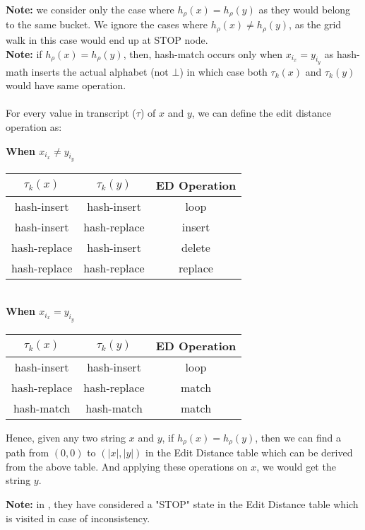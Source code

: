 \documentclass{article}
\begin{document}
\textbf{Note:} we consider only the case where $h_\rho(x)=h_\rho(y)$ as they 
would belong to the same bucket. We ignore the cases where 
$h_\rho(x)\neq h_\rho(y)$, as the grid walk in this case would end up at STOP
node.\\
\textbf{Note:} if $h_\rho(x)=h_\rho(y)$, then, hash-match occurs only when
$x_{i_x}=y_{i_y}$ as hash-math inserts the actual alphabet (not $\bot$) in which
case both $\tau_k(x)$ and $\tau_k(y)$ would have same operation.\\
\\
For every value in transcript ($\tau$) of $x$ and $y$, we can define the edit
distance operation as:
\begin{center}
    \textbf{When $x_{i_x}\neq y_{i_y}$}\\
    \begin{tabular}{|c|c|c|}
        \hline
        $\tau_k(x)$ & $\tau_k(y)$ & ED Operation \\
        \hline
        hash-insert & hash-insert & loop \\
        hash-insert & hash-replace & insert \\
        hash-replace & hash-insert & delete \\
        hash-replace & hash-replace & replace \\
        \hline
    \end{tabular}\\
    
    \textbf{When $x_{i_x}= y_{i_y}$}\\
    \begin{tabular}{|c|c|c|}
        \hline
        $\tau_k(x)$ & $\tau_k(y)$ & ED Operation \\
        \hline
        hash-insert & hash-insert & loop \\
        hash-replace & hash-replace & match \\
        hash-match & hash-match & match\\
        \hline
    \end{tabular}
\end{center}

Hence, given any two string $x$ and $y$, if $h_\rho(x)=h_\rho(y)$, then we can
find a path from $(0,0)$ to $(|x|,|y|)$ in the Edit Distance table which can be
derived from the above table. And applying these operations on $x$, we would get
the string $y$.

\textbf{Note:} in \cite{McC21}, they have considered a "STOP" state in the Edit Distance 
table which is visited in case of inconsistency.\\
\end{document}
